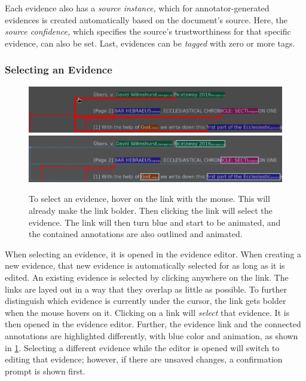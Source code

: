 Each evidence also has a \emph{source instance,} which for annotator-generated evidences is created automatically based on the document's source.
Here, the \emph{source confidence,} which specifies the source's trustworthiness for that specific evidence, can also be set.
Last, evidences can be \emph{tagged} with zero or more tags.


\subsubsection{Selecting an Evidence}
\label{sec:evidence-selection}

\begin{figure}[htb]
  \centering
  \includegraphics[width=430pt]{../src/assets/annotator-documentation/select-evidence-1.png}\\
  \vspace{10pt}
  \includegraphics[width=430pt]{../src/assets/annotator-documentation/select-evidence-2.png}

  \caption{
    To select an evidence, hover on the link with the mouse.
    This will already make the link bolder.
    Then clicking the link will select the evidence.
    The link will then turn blue and start to be animated, and the contained annotations are also outlined and animated.
  }
  \label{fig:select-evidence}
\end{figure}

When selecting an evidence, it is opened in the evidence editor.
When creating a new evidence, that new evidence is automatically selected for as long as it is edited.
An existing evidence is selected by clicking anywhere on the link.
The links are layed out in a way that they overlap as little as possible.
To further distinguish which evidence is currently under the cursor, the link gets bolder when the mouse hovers on it.
Clicking on a link will \emph{select} that evidence.
It is then opened in the evidence editor.
Further, the evidence link and the connected annotations are highlighted differently, with blue color and animation, as shown in \cref{fig:select-evidence}.
Selecting a different evidence while the editor is opened will switch to editing that evidence;
however, if there are unsaved changes, a confirmation prompt is shown first.


